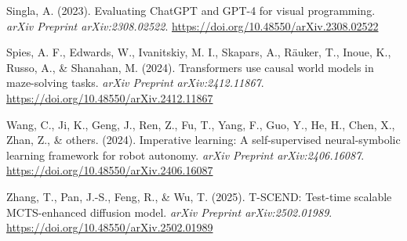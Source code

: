 \documentclass[10pt,a4paper,onecolumn]{article}
\newlength{\cslhangindent}
\newenvironment{CSLReferences}[2] %
 {\begin{list}{}{%
  \setlength{\itemindent}{0pt}
  \setlength{\leftmargin}{0pt}
  \setlength{\parsep}{0pt}
  \ifodd #1
   \setlength{\leftmargin}{\cslhangindent}
   \setlength{\itemindent}{-1\cslhangindent}
  \fi
  \setlength{\itemsep}{#2\baselineskip}}}
 {\end{list}}
\begin{document}
\begin{CSLReferences}{1}{0.5}
\leavevmode{}%
Singla, A. (2023). Evaluating ChatGPT and GPT-4 for visual programming.
\emph{arXiv Preprint arXiv:2308.02522}.
\url{https://doi.org/10.48550/arXiv.2308.02522}

\leavevmode{}%
Spies, A. F., Edwards, W., Ivanitskiy, M. I., Skapars, A., Räuker, T.,
Inoue, K., Russo, A., \& Shanahan, M. (2024). Transformers use causal
world models in maze-solving tasks. \emph{arXiv Preprint
arXiv:2412.11867}. \url{https://doi.org/10.48550/arXiv.2412.11867}

\leavevmode{}%
Wang, C., Ji, K., Geng, J., Ren, Z., Fu, T., Yang, F., Guo, Y., He, H.,
Chen, X., Zhan, Z., \& others. (2024). Imperative learning: A
self-supervised neural-symbolic learning framework for robot autonomy.
\emph{arXiv Preprint arXiv:2406.16087}.
\url{https://doi.org/10.48550/arXiv.2406.16087}

\leavevmode{}%
Zhang, T., Pan, J.-S., Feng, R., \& Wu, T. (2025). T-SCEND: Test-time
scalable MCTS-enhanced diffusion model. \emph{arXiv Preprint
arXiv:2502.01989}. \url{https://doi.org/10.48550/arXiv.2502.01989}

\end{CSLReferences}
\end{document}
